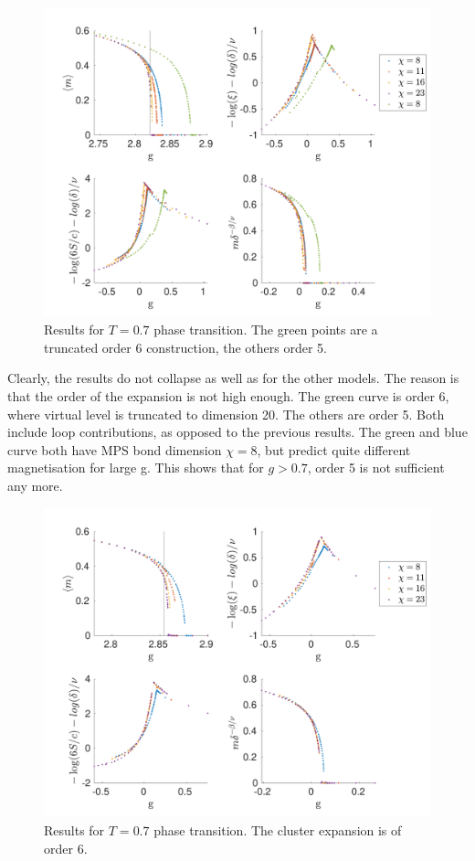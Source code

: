 \begin{figure}
    \center
    \includegraphics[width=\textwidth]{Figuren/phasediag/t07/full.pdf}
    \caption{Results for $T=0.7$ phase transition. The green points are a truncated order 6 construction, the others order 5.  }
    \label{fig:phase:t07:full}
\end{figure}

Clearly, the results do not collapse as well as for the other models. The reason is that the order of the expansion is not high enough. The green curve is order 6, where virtual level is truncated to dimension 20. The others are order 5. Both include loop contributions, as opposed to the previous results. The green and blue curve both have MPS bond dimension $\chi=8$, but predict quite different magnetisation for large g. This shows that for $g>0.7$, order 5 is not sufficient any more.

\begin{figure}
    \center
    \includegraphics[width=\textwidth]{Figuren/phasediag/t07/zoomed2.pdf}
    \caption{Results for $T=0.7$ phase transition. The cluster expansion is of order 6.}
    \label{fig:phase:t07:full2}
\end{figure}

